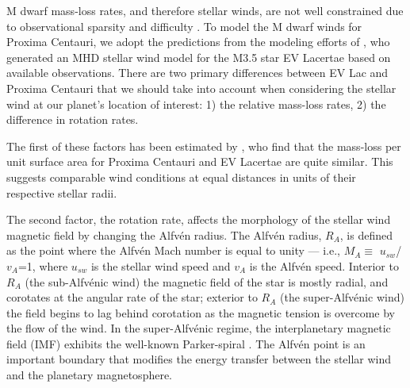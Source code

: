 \documentclass{emulateapj}
\begin{document}
M dwarf mass-loss rates, and therefore stellar winds, are not well constrained due to observational sparsity and difficulty \citep[e.g.][]{Wood2004}. To model the M dwarf winds for Proxima Centauri, we adopt the predictions from the modeling efforts of \citet{Cohen2014}, who generated an MHD stellar wind model for the M3.5 star EV Lacertae based on available observations. There are two primary differences between EV Lac and Proxima Centauri that we should take into account when considering the stellar wind at our planet's location of interest: 1) the relative mass-loss rates, 2) the difference in rotation rates. 

The first of these factors has been estimated by \citet{Wood2005}, who find that the mass-loss per unit surface area for Proxima Centauri and EV Lacertae are quite similar. This suggests comparable wind conditions at equal distances in units of their respective stellar radii. 

The second factor, the rotation rate, affects the morphology of the stellar wind magnetic field by changing the Alfv\'{e}n radius.  The Alfv\'{e}n radius, $R_A$, is defined as the point where the Alfv\'{e}n Mach number is equal to unity --- i.e., $M_A \equiv$ $u_{sw}$/$v_{A}$=1, where $u_{sw}$ is the stellar wind speed and $v_A$ is the Alfv\'{e}n speed. Interior to $R_A$ (the sub-Alfv\'{e}nic wind) the magnetic field of the star is mostly radial, and corotates at the angular rate of the star; exterior to $R_A$ (the super-Alfv\'{e}nic wind) the field begins to lag behind corotation as the magnetic tension is overcome by the flow of the wind. In the super-Alfv\'{e}nic regime, the interplanetary magnetic field (IMF) exhibits the well-known Parker-spiral \citep{Parker1958}. The Alfv\'{e}n point is an important boundary that modifies the energy transfer between the stellar wind and the planetary magnetosphere.
\end{document}
